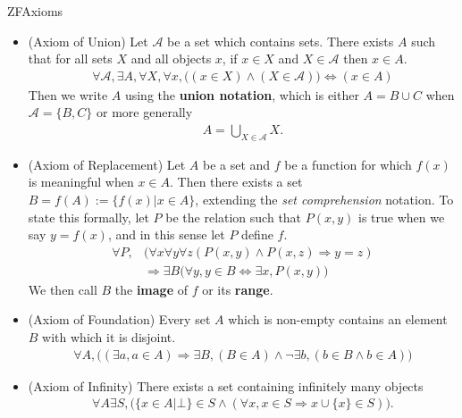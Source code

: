 \documentclass[11pt]{article}
\begin{document}
\begin{label definition}{ZFAxioms}
\begin{itemize}
\item (Axiom of Union) Let $\mathcal{A}$ be a set which contains sets. There exists $A$ such that for all sets $X$ and all objects $x$, if $x \in X$ and $X \in \mathcal{A}$ then $x \in A$. \begin{gather*}
\forall \mathcal{A}, \exists A, \forall X, \forall x, \big( (x \in X) \wedge (X \in \mathcal{A}) \big) \Leftrightarrow (x \in A)
\end{gather*}
Then we write $A$ using the \textbf{union notation}, which is either $A = B \cup C$ when $\mathcal{A} = \{B, C\}$ or more generally \begin{gather*}
A = \bigcup_{X \in \mathcal{A}} X.
\end{gather*}

\item (Axiom of Replacement) Let $A$ be a set and $f$ be a function for which $f(x)$ is meaningful when $x \in A$. Then there exists a set $B = f(A) := \{f(x) | x \in A\}$, extending the \emph{set comprehension} notation. To state this formally, let $P$ be the relation such that $P(x,y)$ is true when we say $y = f(x)$, and in this sense let $P$ define $f$.
\begin{align*}
\forall P, & \big( \forall x \forall y \forall z ( P(x,y) \wedge P(x,z) \Rightarrow y = z) \\
& \Rightarrow \exists B (\forall y, y \in B \Leftrightarrow \exists x, P(x,y)\big)
\end{align*}
We then call $B$ the \textbf{image} of $f$ or its \textbf{range}.

\item (Axiom of Foundation) Every set $A$ which is non-empty contains an element $B$ with which it is disjoint. \begin{gather*}
\forall A, \big( (\exists a, a \in A) \Rightarrow \exists B, (B \in A) \wedge \neg \exists b, (b \in B \wedge b \in A) \big)
\end{gather*}

\item (Axiom of Infinity) There exists a set containing infinitely many objects \begin{gather*}
\forall A \exists S, \big( \{ x \in A| \bot\} \in S \wedge (\forall x, x \in S \Rightarrow x \cup \{x\} \in S)\big).
\end{gather*}

\end{itemize}
\end{label definition}
\end{document}
